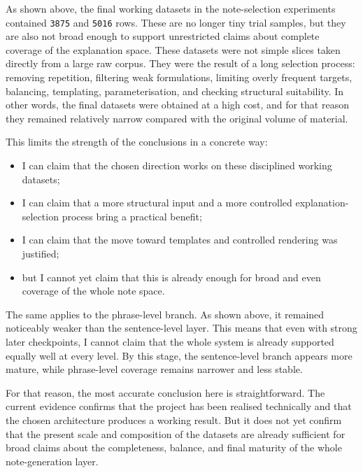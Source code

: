 \documentclass[12pt,a4paper,oneside]{report}
\begin{document}
As shown above, the final working datasets in the note-selection experiments contained \texttt{3875} and \texttt{5016} rows. These are no longer tiny trial samples, but they are also not broad enough to support unrestricted claims about complete coverage of the explanation space. These datasets were not simple slices taken directly from a large raw corpus. They were the result of a long selection process: removing repetition, filtering weak formulations, limiting overly frequent targets, balancing, templating, parameterisation, and checking structural suitability. In other words, the final datasets were obtained at a high cost, and for that reason they remained relatively narrow compared with the original volume of material.

This limits the strength of the conclusions in a concrete way:
\begin{itemize}
  \item I can claim that the chosen direction works on these disciplined working datasets;
  \item I can claim that a more structural input and a more controlled explanation-selection process bring a practical benefit;
  \item I can claim that the move toward templates and controlled rendering was justified;
  \item but I cannot yet claim that this is already enough for broad and even coverage of the whole note space.
\end{itemize}

The same applies to the phrase-level branch. As shown above, it remained noticeably weaker than the sentence-level layer. This means that even with strong later checkpoints, I cannot claim that the whole system is already supported equally well at every level. By this stage, the sentence-level branch appears more mature, while phrase-level coverage remains narrower and less stable.

For that reason, the most accurate conclusion here is straightforward. The current evidence confirms that the project has been realised technically and that the chosen architecture produces a working result. But it does not yet confirm that the present scale and composition of the datasets are already sufficient for broad claims about the completeness, balance, and final maturity of the whole note-generation layer.
\end{document}
